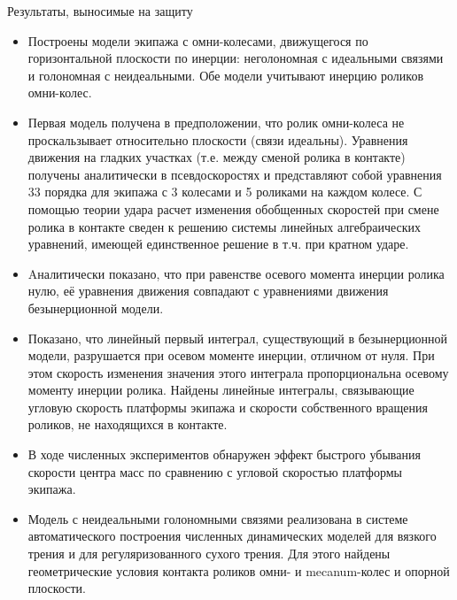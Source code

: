 \begin{frame}[allowframebreaks]{Результаты, выносимые на защиту}
    \small{
    \begin{itemize}
        \item {
            Построены модели экипажа с омни-колесами, движущегося по горизонтальной плоскости по инерции: неголономная с идеальными связями и голономная с неидеальными. Обе модели учитывают инерцию роликов омни-колес.
        }
        \item {
            Первая модель получена в предположении, что ролик омни-колеса не проскальзывает относительно плоскости (связи идеальны). Уравнения движения на гладких участках  (т.е. между сменой ролика в контакте) получены аналитически в псевдоскоростях и представляют собой уравнения 33 порядка для экипажа с 3 колесами и 5 роликами на каждом колесе. С помощью теории удара расчет изменения обобщенных скоростей при смене ролика в контакте сведен к решению системы линейных алгебраических уравнений, имеющей единственное решение в т.ч. при кратном ударе.
        }
        \item {
            Aналитически показано, что при равенстве осевого момента инерции ролика нулю, её уравнения движения совпадают с уравнениями движения безынерционной модели.
        }
        \item {
            Показано, что линейный первый интеграл, существующий в безынерционной модели, разрушается при осевом моменте инерции, отличном от нуля. При этом скорость изменения значения этого интеграла пропорциональна осевому моменту инерции ролика. Найдены линейные интегралы, связывающие угловую скорость платформы экипажа и скорости собственного вращения роликов, не находящихся в контакте.
        }
        \item {
            В ходе численных экспериментов обнаружен эффект быстрого убывания скорости центра масс по сравнению с угловой скоростью платформы экипажа.
        }
        \item {
            Модель с неидеальными голономными связями реализована в системе автоматического построения численных динамических моделей для вязкого трения и для регуляризованного сухого трения. Для этого найдены геометрические условия контакта роликов омни- и mecanum-колес и опорной плоскости.
}
\end{itemize}}
\end{frame}
